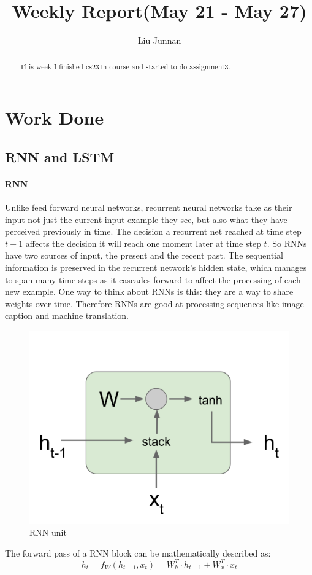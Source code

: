 \documentclass{article} %
\title{Weekly Report(May 21 - May 27)}
\author{
Liu Junnan
}
\begin{document}
\maketitle

\begin{abstract}
This week I finished cs231n course and started to do assignment3.
\end{abstract}

\section{Work Done}
\subsection{RNN and LSTM}
\paragraph{RNN}
Unlike feed forward neural networks, recurrent neural networks take as their input not just the current input example they see, but also what they have perceived previously in time. The decision a recurrent net reached at time step $t-1$ affects the decision it will reach one moment later at time step $t$. So RNNs have two sources of input, the present and the recent past. The sequential information is preserved in the recurrent network’s hidden state, which manages to span many time steps as it cascades forward to affect the processing of each new example. One way to think about RNNs is this: they are a way to share weights over time. Therefore RNNs are good at processing sequences like image caption and machine translation. 

\begin{figure}[H]
	\centering
	\includegraphics[width=.4\textwidth]{rnn.png}
	\caption{RNN unit}
\end{figure}

The forward pass of a RNN block can be mathematically described as:
\begin{equation}
h_t=f_W(h_{t-1},x_t)=W_h^T \cdot h_{t-1} + W_x^T \cdot x_t
\label{eqn:rnn}
\end{equation}
\end{document}
